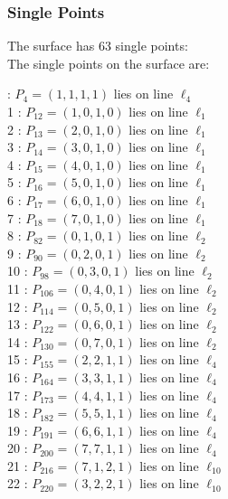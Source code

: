 \documentclass{article}
\begin{document}
{\subsubsection*{Single Points}
The surface has 63 single points:\\
The single points on the surface are:\\
\begin{multicols}{2}
 : $P_{4}=( 1, 1, 1, 1 )$ lies on line $\ell_{4}$\\
1 : $P_{12}=( 1, 0, 1, 0 )$ lies on line $\ell_{1}$\\
2 : $P_{13}=( 2, 0, 1, 0 )$ lies on line $\ell_{1}$\\
3 : $P_{14}=( 3, 0, 1, 0 )$ lies on line $\ell_{1}$\\
4 : $P_{15}=( 4, 0, 1, 0 )$ lies on line $\ell_{1}$\\
5 : $P_{16}=( 5, 0, 1, 0 )$ lies on line $\ell_{1}$\\
6 : $P_{17}=( 6, 0, 1, 0 )$ lies on line $\ell_{1}$\\
7 : $P_{18}=( 7, 0, 1, 0 )$ lies on line $\ell_{1}$\\
8 : $P_{82}=( 0, 1, 0, 1 )$ lies on line $\ell_{2}$\\
9 : $P_{90}=( 0, 2, 0, 1 )$ lies on line $\ell_{2}$\\
10 : $P_{98}=( 0, 3, 0, 1 )$ lies on line $\ell_{2}$\\
11 : $P_{106}=( 0, 4, 0, 1 )$ lies on line $\ell_{2}$\\
12 : $P_{114}=( 0, 5, 0, 1 )$ lies on line $\ell_{2}$\\
13 : $P_{122}=( 0, 6, 0, 1 )$ lies on line $\ell_{2}$\\
14 : $P_{130}=( 0, 7, 0, 1 )$ lies on line $\ell_{2}$\\
15 : $P_{155}=( 2, 2, 1, 1 )$ lies on line $\ell_{4}$\\
16 : $P_{164}=( 3, 3, 1, 1 )$ lies on line $\ell_{4}$\\
17 : $P_{173}=( 4, 4, 1, 1 )$ lies on line $\ell_{4}$\\
18 : $P_{182}=( 5, 5, 1, 1 )$ lies on line $\ell_{4}$\\
19 : $P_{191}=( 6, 6, 1, 1 )$ lies on line $\ell_{4}$\\
20 : $P_{200}=( 7, 7, 1, 1 )$ lies on line $\ell_{4}$\\
21 : $P_{216}=( 7, 1, 2, 1 )$ lies on line $\ell_{10}$\\
22 : $P_{220}=( 3, 2, 2, 1 )$ lies on line $\ell_{10}$\\

\end{multicols}}
\end{document}
